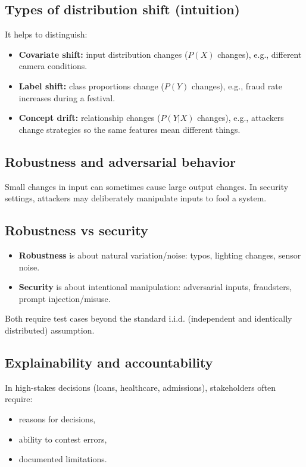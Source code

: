 \documentclass[11pt]{article}
\begin{document}
\subsection{Types of distribution shift (intuition)}
It helps to distinguish:
\begin{itemize}[leftmargin=*]
  \item \textbf{Covariate shift:} input distribution changes ($P(X)$ changes), e.g., different camera conditions.
  \item \textbf{Label shift:} class proportions change ($P(Y)$ changes), e.g., fraud rate increases during a festival.
  \item \textbf{Concept drift:} relationship changes ($P(Y|X)$ changes), e.g., attackers change strategies so the same features mean different things.
\end{itemize}

\subsection{Robustness and adversarial behavior}
Small changes in input can sometimes cause large output changes. In security settings, attackers may deliberately manipulate inputs to fool a system.

\subsection{Robustness vs security}
\begin{itemize}[leftmargin=*]
  \item \textbf{Robustness} is about natural variation/noise: typos, lighting changes, sensor noise.
  \item \textbf{Security} is about intentional manipulation: adversarial inputs, fraudsters, prompt injection/misuse.
\end{itemize}
Both require test cases beyond the standard i.i.d. (independent and identically distributed) assumption.

\subsection{Explainability and accountability}
In high-stakes decisions (loans, healthcare, admissions), stakeholders often require:
\begin{itemize}[leftmargin=*]
  \item reasons for decisions,
  \item ability to contest errors,
  \item documented limitations.
\end{itemize}
\end{document}
